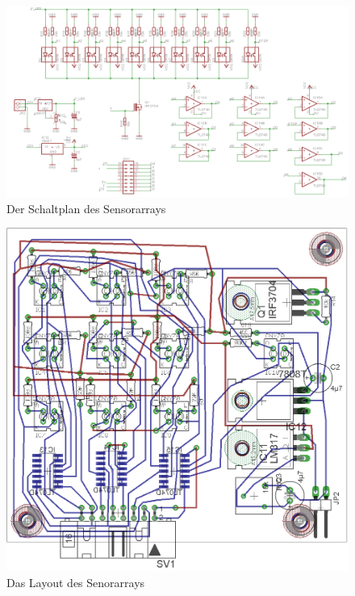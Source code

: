 \documentclass[a4paper,bibtotoc,oneside]{scrbook}
\begin{document}
\begin{figure}[htbp]
\centering
\includegraphics[width=125mm]{img/array.png}
\caption{Der Schaltplan des Sensorarrays}\label{array}
\end{figure}

\begin{figure}[htbp]
\centering
\includegraphics[width=125mm]{img/array21.png}
\caption{Das Layout des Senorarrays}\label{array2}
\end{figure}
\end{document}
